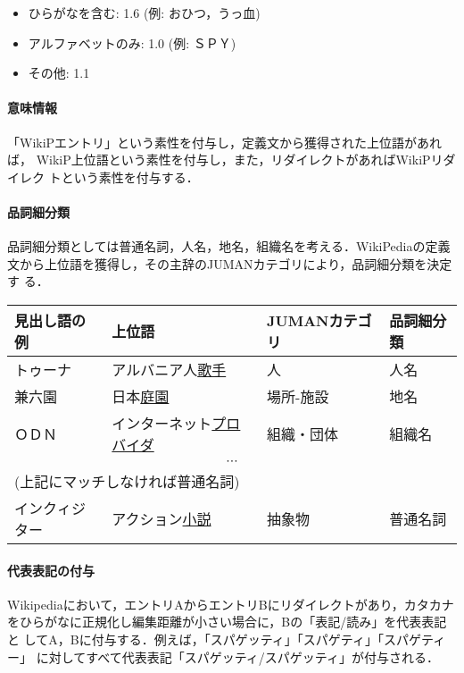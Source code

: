\documentclass[a4j,titlepage]{jarticle}
\begin{document}
\begin{itemize}
 \item ひらがなを含む: 1.6 (例: おひつ，うっ血)
 \item アルファベットのみ: 1.0 (例: ＳＰＹ)
 \item その他: 1.1
\end{itemize}

\paragraph{意味情報}

「WikiPエントリ」という素性を付与し，定義文から獲得された上位語があれば，
WikiP上位語という素性を付与し，また，リダイレクトがあればWikiPリダイレク
トという素性を付与する．

\paragraph{品詞細分類}

品詞細分類としては普通名詞，人名，地名，組織名を考える．WikiPediaの定義
文から上位語を獲得し，その主辞のJUMANカテゴリにより，品詞細分類を決定す
る．

\begin{center}
\begin{tabular}{llll}\hline
見出し語の例 & 上位語 & JUMANカテゴリ & 品詞細分類 \\\hline
トゥーナ & アルバニア人\underline{歌手} & 人 & 人名 \\
兼六園 & 日本\underline{庭園} & 場所-施設 & 地名\\ 
ＯＤＮ & インターネット\underline{プロバイダ} & 組織・団体 & 組織名  \\
\multicolumn{4}{c}{$\cdots$}\\
\multicolumn{4}{l}{(上記にマッチしなければ普通名詞)}\\
インクィジター & アクション\underline{小説} & 抽象物 & 普通名詞  \\
\hline
 \end{tabular}
\end{center}

\paragraph{代表表記の付与}

Wikipediaにおいて，エントリAからエントリBにリダイレクトがあり，カタカナ
をひらがなに正規化し編集距離が小さい場合に，Bの「表記/読み」を代表表記と
してA，Bに付与する．例えば，「スパゲッティ」「スパゲティ」「スパゲティー」
に対してすべて代表表記「スパゲッティ/スパゲッティ」が付与される．
\end{document}
